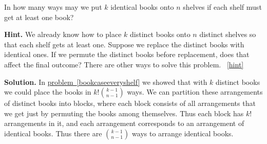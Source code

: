 \documentclass{book}
\begin{document}
\setcounter{project}{127}
\addtocounter{project}{-1}
\begin{activity}[]\label{activity-120}
\hypertarget{p-900}{}%
In how many ways may we put \(k\) identical books onto \(n\) shelves if each shelf must get at least one book?%
\par\smallskip%
\noindent\textbf{Hint.}\hypertarget{hint-85}{}\quad%
\hypertarget{p-901}{}%
We already know how to place \(k\) distinct books onto \(n\) distinct shelves so that each shelf gets at least one. Suppose we replace the distinct books with identical ones. If we permute the distinct books before replacement, does that affect the final outcome? There are other ways to solve this problem.%
~\hfill{\tiny\hyperlink{a-127}{[hint]}\hypertarget{q-127}{}}\par\smallskip%
\noindent\textbf{Solution.}\hypertarget{solution-95}{}\quad%
\hypertarget{p-902}{}%
In \hyperref[bookcaseeveryshelf]{problem~\ref{bookcaseeveryshelf}} we showed that with \(k\) distinct books we could place the books in \(k!\binom{k-1}{n-1}\) ways. We can partition these arrangements of distinct books into blocks, where each block consists of all arrangements that we get just by permuting the books among themselves. Thus each block has \(k!\) arrangements in it, and each arrangement corresponds to an arrangement of identical books. Thus there are \(\binom{k-1}{n-1}\) ways to arrange identical books.%
\end{activity}
\end{document}

